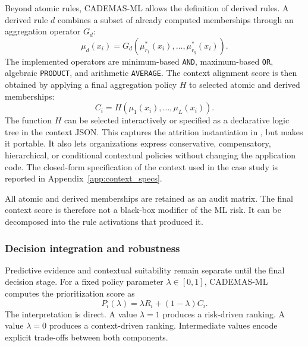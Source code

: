 \documentclass{interact}
\begin{document}
Beyond atomic rules, CADEMAS-ML allows the definition of derived rules. A derived rule $d$ combines a subset of already computed memberships through an aggregation operator $G_d$:
\begin{equation}
\mu_d(x_i)=G_d\left(\mu_{r_1}^{*}(x_i),\ldots,\mu_{r_q}^{*}(x_i)\right).
\label{eq:derived_mu}
\end{equation}
The implemented operators are minimum-based \texttt{AND}, maximum-based \texttt{OR}, algebraic \texttt{PRODUCT}, and arithmetic \texttt{AVERAGE}. The context alignment score is then obtained by applying a final aggregation policy $H$ to selected atomic and derived memberships:
\begin{equation}
C_i = H\left(\mu_1(x_i),\ldots,\mu_L(x_i)\right).
\label{eq:context_score}
\end{equation}
The function $H$ can be selected interactively or specified as a declarative logic tree in the context JSON. This captures the attrition instantiation in \citet{Godz2026}, but makes it portable. It also lets organizations express conservative, compensatory, hierarchical, or conditional contextual policies without changing the application code. The closed-form specification of the context used in the case study is reported in Appendix~\ref{app:context_specs}.

All atomic and derived memberships are retained as an audit matrix. The final context score is therefore not a black-box modifier of the ML risk. It can be decomposed into the rule activations that produced it.

\subsubsection{Decision integration and robustness}

Predictive evidence and contextual suitability remain separate until the final decision stage. For a fixed policy parameter $\lambda\in[0,1]$, CADEMAS-ML computes the prioritization score as
\begin{equation}
P_i(\lambda)=\lambda R_i+(1-\lambda)C_i.
\label{eq:priority_lambda}
\end{equation}
The interpretation is direct. A value $\lambda=1$ produces a risk-driven ranking. A value $\lambda=0$ produces a context-driven ranking. Intermediate values encode explicit trade-offs between both components.
\end{document}
